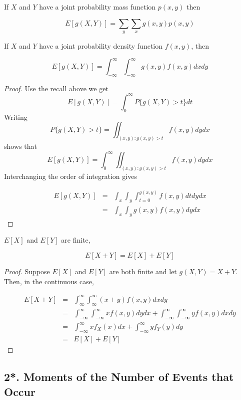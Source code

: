 \begin{prop*}
	If $X$ and $Y$ have a joint probability mass function $p(x,y)$ then 
	
	$$E[g(X,Y)] = \sum_y\sum_x g(x,y)p(x,y)$$
	
	If $X$ and $Y$ have a joint probability density function $f(x,y)$, then
	
	$$E[g(X,Y)] = \int^{\infty}_{-\infty}\int^{\infty}_{-\infty} g(x,y)f(x,y)dxdy$$
\end{prop*}

\begin{proof}
	Use the recall above we get
	$$E[g(X,Y)] = \int^{\infty}_0 P\{g(X,Y) > t\}dt$$
	Writing 
	$$P\{g(X,Y) > t\} = \iint_{(x,y):g(x,y) > t}f(x,y)dydx$$
	shows that
	$$E[g(X,Y)] = \int^{\infty}_{0}\iint_{(x,y):g(x,y)>t}f(x,y)dydx$$
	Interchanging the order of integration gives
	
	\begin{eqnarray*}
		E[g(X,Y)] &=& \int_x\int_y\int^{g(x,y)}_{t = 0}f(x,y)dtdydx\\
		&=& \int_x\int_yg(x,y)f(x,y)dydx
	\end{eqnarray*}
\end{proof}

\begin{cor*}
	$E[X]$ and $E[Y]$ are finite,
	
	$$E[X + Y] = E[X] + E[Y]$$
	
\end{cor*}

\begin{proof}
	Suppose $E[X]$ and $E[Y]$ are both finite and let $g(X,Y) = X + Y$. Then, in the continuous case,
	
	\begin{eqnarray*}
		E[X + Y] &=& \int^{\infty}_{\infty}\int^{\infty}_{\infty}(x + y)f(x,y)dxdy\\
		&=& \int^{\infty}_{-\infty}\int^{\infty}_{-\infty}xf(x,y)dydx + \int^{\infty}_{-\infty}\int^{\infty}_{-\infty}yf(x,y)dxdy\\
		&=& \int^{\infty}_{-\infty}xf_X(x)dx + \int^{\infty}_{-\infty}yf_Y(y)dy\\
		&=& E[X] + E[Y]
	\end{eqnarray*}
\end{proof}

\newpage

\subsection*{2*. Moments of the Number of Events that Occur} $ $

